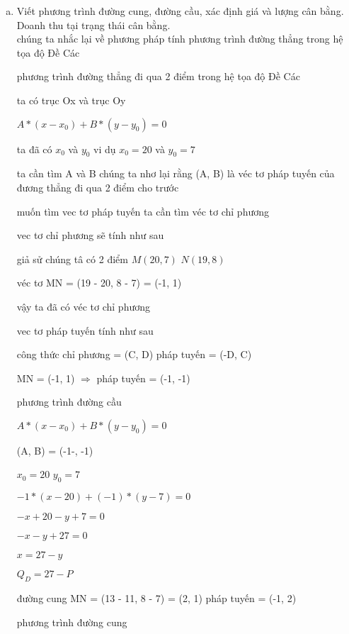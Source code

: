 \documentclass{report}
\begin{document}
\begin{enumerate}[(a)]
    \item Viết phương trình đường cung, đường cầu, xác định giá và lượng cân bằng. Doanh thu
          tại trạng thái cân bằng.
          \\
          chúng ta nhắc lại về phương pháp tính phương trình đường thẳng trong hệ tọa độ Đề Các

          phương trình đường thẳng
          đi qua 2 điểm trong hệ tọa độ Đề Các

          ta có trục Ox và trục Oy

          $A * (x - x_0) + B * (y - y_0) = 0$

          ta đã có $x_0$ và $y_0$
          vi dụ $x_0 = 20$ và $y_0 = 7$

          ta cần tìm A và B
          chúng ta nhơ lại rằng (A, B) là véc tơ pháp tuyến  của đương thẳng đi qua 2 điểm cho trước

          muốn tìm  vec tơ pháp tuyến ta cần tìm véc tơ chỉ phương

          vec tơ chỉ phương sẽ tính như sau

          giả sử chúng tâ có 2 điểm
          $M(20, 7)$ $N(19, 8)$

          véc tơ MN = (19 - 20, 8 - 7) = (-1, 1)

          vậy ta đã có véc tơ chỉ phương

          vec tơ pháp tuyến tính như sau

          công thức
          chỉ phương = (C, D)
          pháp tuyến = (-D, C)

          MN =  (-1, 1)
          $\Rightarrow$ pháp tuyến = (-1, -1)

          phương trình đường cầu

          $A * (x - x_0) + B * (y - y_0) = 0$

          (A, B) = (-1-, -1)

          $x_0 = 20$ $y_0= 7$

          $-1 * (x - 20) + (-1) * (y - 7) = 0$

          $-x + 20 - y + 7 = 0$

          $-x - y + 27 = 0$

          $x = 27 - y$

          $Q_D = 27 - P$

          đường cung
          MN = (13 - 11, 8 - 7) = (2, 1)
          pháp tuyến = (-1, 2)

          phương trình đường cung


\end{enumerate}
\end{document}
